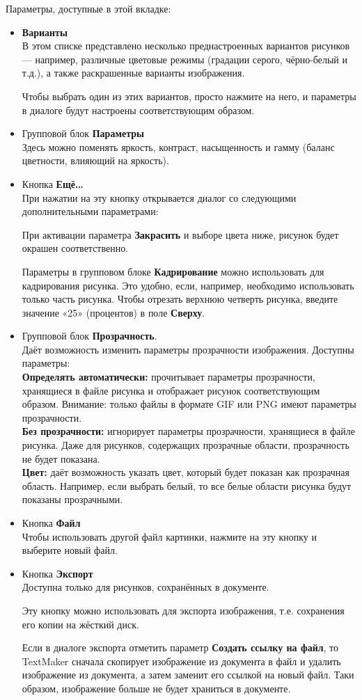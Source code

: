 ﻿\documentclass[a4paper,10pt]{article}
\begin{document}
Параметры, доступные в этой вкладке:
\begin{itemize}
 \item \textbf{Варианты}\\
 В этом списке представлено несколько преднастроенных вариантов рисунков — например, различные цветовые режимы (градации серого, чёрно-белый и т.д.), а также раскрашенные варианты изображения.
 
 Чтобы выбрать один из этих вариантов, просто нажмите на него, и параметры в диалоге будут настроены соответствующим образом.
 \item Групповой блок \textbf{Параметры}\\
 Здесь можно поменять яркость, контраст, насыщенность и гамму (баланс цветности, влияющий на яркость).
 \item Кнопка \textbf{Ещё…}\\
 При нажатии на эту кнопку открывается диалог со следующими дополнительными параметрами:
 
 При активации параметра \textbf{Закрасить} и выборе цвета ниже, рисунок  будет окрашен соответственно.
 
 Параметры в групповом блоке \textbf{Кадрирование} можно использовать для кадрирования рисунка. Это удобно, если, например, необходимо использовать только часть рисунка. Чтобы отрезать верхнюю четверть рисунка, введите значение «25» (процентов) в поле \textbf{Сверху}.
 \item Групповой блок \textbf{Прозрачность}.\\
 Даёт возможность изменить параметры прозрачности изображения. Доступны параметры:\\
 \textbf{Определять автоматически:} прочитывает параметры прозрачности, хранящиеся в файле рисунка и отображает рисунок соответствующим образом. Внимание: только файлы в формате GIF или PNG имеют параметры прозрачности.\\
 \textbf{Без прозрачности:} игнорирует параметры прозрачности, хранящиеся в файле рисунка. Даже для рисунков, содержащих прозрачные области, прозрачность не будет показана.\\
 \textbf{Цвет:} даёт возможность указать цвет, который будет показан как прозрачная область. Например, если выбрать белый, то все белые области рисунка будут показаны прозрачными.
 \item Кнопка \textbf{Файл}\\
 Чтобы использовать другой файл картинки, нажмите на эту кнопку и выберите новый файл.\\
 \item Кнопка \textbf{Экспорт}\\
 Доступна только для рисунков, сохранённых в документе.
 
 Эту кнопку можно использовать для экспорта изображения, т.е. сохранения его копии на жёсткий диск.
 
 Если в диалоге экспорта отметить параметр \textbf{Создать ссылку на файл}, то TextMaker сначала скопирует изображение из документа в файл и удалить изображение из документа, а затем заменит его ссылкой на новый файл. Таки образом, изображение больше не будет храниться в документе.
\end{itemize}
\end{document}
